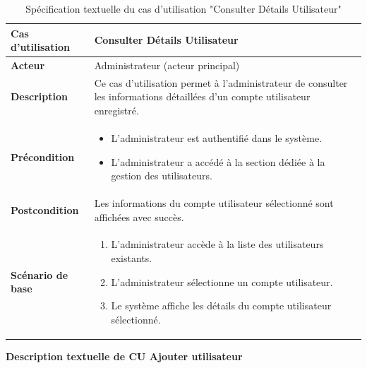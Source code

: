 \documentclass[a4paper,11pt]{report}
\begin{document}
\begin{table}[H]
  \centering
  \renewcommand{\arraystretch}{1.5}
  \caption{Spécification textuelle du cas d'utilisation "Consulter Détails Utilisateur"}
  \begin{tabularx}{\textwidth}{|l|X|}
    \hline
    \textbf{Cas d'utilisation} & Consulter Détails Utilisateur \\ \hline
    \textbf{Acteur} & Administrateur (acteur principal) \\ \hline
    \textbf{Description} & Ce cas d'utilisation permet à l'administrateur de consulter les informations détaillées d'un compte utilisateur enregistré. \\ \hline
    \textbf{Précondition} &
    \begin{itemize}[leftmargin=*]
      \item L’administrateur est authentifié dans le système.
      \item L’administrateur a accédé à la section dédiée à la gestion des utilisateurs.
    \end{itemize} \\ \hline
    \textbf{Postcondition} & Les informations du compte utilisateur sélectionné sont affichées avec succès. \\ \hline
    \textbf{Scénario de base} &
    \begin{enumerate}[leftmargin=*]
      \item L’administrateur accède à la liste des utilisateurs existants.
      \item L’administrateur sélectionne un compte utilisateur.
      \item Le système affiche les détails du compte utilisateur sélectionné.
    \end{enumerate} \\ \hline
  \end{tabularx}
\end{table}


\newpage
\textbf{Description textuelle de CU Ajouter utilisateur}
\end{document}
